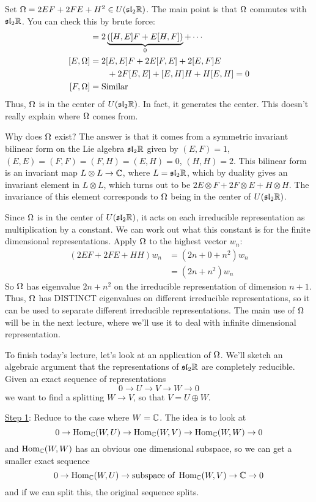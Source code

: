  Set $\Omega = 2EF + 2FE +
 H^2\in U(\mathfrak{sl}_2\mathbb{R})$. The main point is that $\Omega$ commutes with $\mathfrak{sl}_2\mathbb{R}$. You can
 check this by brute force:
 \begin{align*}
   [H,\W] &= 2\underbrace{([H,E]F+E[H,F])}_0+\cdots\\
   [E,\W] &= 2[E,E]F + 2E[F,E] + 2[E,F]E \\
          & \qquad + 2F[E,E] + [E,H]H + H[E,H] = 0\\
   [F,\W] &= \text{Similar}
 \end{align*}
 Thus, $\Omega$ is in the center of $U(\mathfrak{sl}_2\mathbb{R})$. In fact, it generates the center. This
 doesn't really explain where $\Omega$ comes from.
 \begin{remark}
   Why does $\Omega$ exist? The answer is that it comes from a symmetric invariant
   bilinear form on the Lie algebra $\mathfrak{sl}_2\mathbb{R}$ given by $(E,F)=1$,
   $(E,E)=(F,F)=(F,H)=(E,H)=0$, $(H,H)=2$. This bilinear form is an invariant map
   $L\otimes L\to \mathbb{C}$, where $L=\mathfrak{sl}_2\mathbb{R}$, which by duality gives an invariant
   element in $L\otimes L$, which turns out to be $2E\otimes F + 2F\otimes E +
   H\otimes H$. The invariance of this element corresponds to $\Omega$ being in the center
   of $U(\mathfrak{sl}_2\mathbb{R})$.
 \end{remark}
 Since $\Omega$ is in the center of $U(\mathfrak{sl}_2\mathbb{R})$, it acts on each irreducible representation
 as multiplication by a constant. We can work out what this constant is for the
 finite dimensional representations.
 Apply $\Omega$ to the highest vector $w_n$:
 \begin{align*}
   (2EF + 2FE + HH)w_n &= (2n+0+n^2)w_n\\
            &= (2n+n^2)w_n
 \end{align*}
 So $\Omega$ has eigenvalue $2n+n^2$ on the irreducible representation of dimension $n+1$.
 Thus, $\Omega$ has DISTINCT eigenvalues on different irreducible representations, so it
 can be used to separate different irreducible representations. The main use of $\Omega$
 will be in the next lecture, where we'll use it to deal with infinite dimensional
 representation.

 To finish today's lecture, let's look at an application of $\Omega$. We'll sketch an
 algebraic argument that the representations of $\mathfrak{sl}_2 \mathbb{R}$ are completely reducible.
 Given an exact sequence of representations
 \[
    0\to U\to V\to W\to 0
 \]
 we want to find a splitting $W\to V$, so that $V=U\oplus W$.

 \underline{Step 1}: Reduce to the case where $W=\mathbb{C}$. The idea is to look at
 \[
    0\to \operatorname{Hom}_{\mathbb{C}}(W,U)\to \operatorname{Hom}_{\mathbb{C}}(W,V)\to \operatorname{Hom}_{\mathbb{C}}(W,W)\to 0
 \]
 and $\operatorname{Hom}_{\mathbb{C}}(W,W)$ has an obvious one dimensional subspace, so we can get a smaller
 exact sequence
 \[
    0\to \operatorname{Hom}_{\mathbb{C}}(W,U)\to \text{subspace of }\operatorname{Hom}_{\mathbb{C}}(W,V)\to \mathbb{C} \to 0
 \]
 and if we can split this, the original sequence splits.


